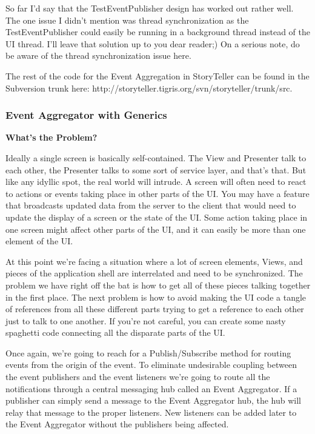 \documentclass{article}
\begin{document}
{So far I'd say that the TestEventPublisher design has worked out rather well.  The one issue I didn't mention was thread synchronization as the TestEventPublisher could easily be running in a background thread instead of the UI thread.  I'll leave that solution up to you dear reader;)  On a serious note, do be aware of the thread synchronization issue here.

The rest of the code for the Event Aggregation in StoryTeller can be found in the Subversion trunk here:  http://storyteller.tigris.org/svn/storyteller/trunk/src.

\subsubsection{     Event Aggregator with Generics } 

\Large {\textbf{What's the Problem?}}

Ideally a single screen is basically self-contained.  The View and Presenter talk to each other, the Presenter talks to some sort of service layer, and that's that.  But like any idyllic spot, the real world will intrude.  A screen will often need to react to actions or events taking place in other parts of the UI.  You may have a feature that broadcasts updated data from the server to the client that would need to update the display of a screen or the state of the UI.  Some action taking place in one screen might affect other parts of the UI, and it can easily be more than one element of the UI. 

At this point we're facing a situation where a lot of screen elements, Views, and pieces of the application shell are interrelated and need to be synchronized.  The problem we have right off the bat is how to get all of these pieces talking together in the first place.  The next problem is how to avoid making the UI code a tangle of references from all these different parts trying to get a reference to each other just to talk to one another.  If you're not careful, you can create some nasty spaghetti code connecting all the disparate parts of the UI.

Once again, we're going to reach for a Publish/Subscribe method for routing events from the origin of the event.  To eliminate undesirable coupling between the event publishers and the event listeners we're going to route all the notifications through a central messaging hub called an Event Aggregator.  If a publisher can simply send a message to the Event Aggregator hub, the hub will relay that message to the proper listeners.  New listeners can be added later to the Event Aggregator without the publishers being affected. 

}
\end{document}
